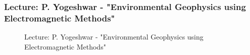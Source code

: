 \documentclass[11pt,a4paper]{article}
\numberwithin{equation}{section}
\numberwithin{table}{section}\setlength{\multlinegap}{25pt}
\begin{document}
\subsubsection{Lecture: P. Yogeshwar - "Environmental Geophysics using Electromagnetic Methods"}

\begin{figure}[H]
\centering
\null\hfill %
\hfill %
\hfill %
\hfill %
\hfill\null %
\caption{Lecture: P. Yogeshwar - "Environmental Geophysics using Electromagnetic Methods"}
\end{figure}
\end{document}
